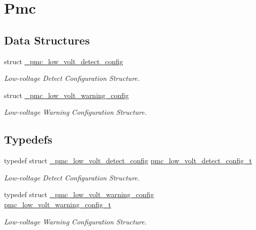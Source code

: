 \hypertarget{group__pmc}{}\section{Pmc}
\label{group__pmc}
\subsection*{Data Structures}
\begin{DoxyCompactItemize}
\item 
struct \mbox{\hyperlink{struct__pmc__low__volt__detect__config}{\+\_\+pmc\+\_\+low\+\_\+volt\+\_\+detect\+\_\+config}}
\begin{DoxyCompactList}\small\item\em Low-\/voltage Detect Configuration Structure. \end{DoxyCompactList}\item 
struct \mbox{\hyperlink{struct__pmc__low__volt__warning__config}{\+\_\+pmc\+\_\+low\+\_\+volt\+\_\+warning\+\_\+config}}
\begin{DoxyCompactList}\small\item\em Low-\/voltage Warning Configuration Structure. \end{DoxyCompactList}\end{DoxyCompactItemize}
\subsection*{Typedefs}
\begin{DoxyCompactItemize}
\item 
\mbox{\label{group__pmc_ga6614b7fa35b6399db446c0d0e7304406}} 
typedef struct \mbox{\hyperlink{struct__pmc__low__volt__detect__config}{\+\_\+pmc\+\_\+low\+\_\+volt\+\_\+detect\+\_\+config}} \mbox{\hyperlink{group__pmc_ga6614b7fa35b6399db446c0d0e7304406}{pmc\+\_\+low\+\_\+volt\+\_\+detect\+\_\+config\+\_\+t}}
\begin{DoxyCompactList}\small\item\em Low-\/voltage Detect Configuration Structure. \end{DoxyCompactList}\item 
\mbox{\label{group__pmc_ga8e06305a65f64f60fa3290e2d09123f7}} 
typedef struct \mbox{\hyperlink{struct__pmc__low__volt__warning__config}{\+\_\+pmc\+\_\+low\+\_\+volt\+\_\+warning\+\_\+config}} \mbox{\hyperlink{group__pmc_ga8e06305a65f64f60fa3290e2d09123f7}{pmc\+\_\+low\+\_\+volt\+\_\+warning\+\_\+config\+\_\+t}}
\begin{DoxyCompactList}\small\item\em Low-\/voltage Warning Configuration Structure. \end{DoxyCompactList}\end{DoxyCompactItemize}
